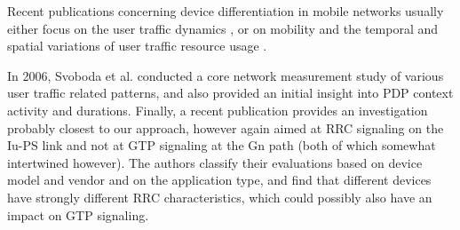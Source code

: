 Recent publications concerning device differentiation in mobile networks usually either focus on the user traffic dynamics \cite{shafiq2011characterizing}, or on mobility and the temporal and spatial variations of user traffic resource usage  \cite{paul2011understanding}.

In 2006, Svoboda et al. \cite{svoboda2006composition} conducted a core network measurement study of various user traffic related patterns, and also provided an initial insight into \ac{PDP} context activity and durations. Finally, a recent publication \cite{he2012panoramic} provides an investigation probably closest to our approach, however again aimed at \ac{RRC} signaling on the Iu-PS link and not at \ac{GTP} signaling at the Gn path (both of which somewhat intertwined however). The authors classify their evaluations based on device model and vendor and on the application type, and find that different devices have strongly different \ac{RRC} characteristics, which could possibly also have an impact on \ac{GTP} signaling.







